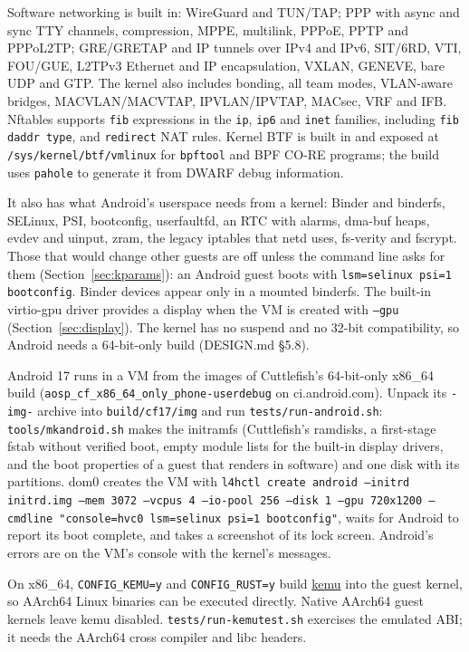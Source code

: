 \documentclass[11pt,a4paper]{report}
\newcommand{\cmd}[1]{\texttt{#1}}
\newcommand{\file}[1]{\texttt{#1}}
\begin{document}
Software networking is built in: WireGuard and TUN/TAP; PPP with async and
sync TTY channels, compression, MPPE, multilink, PPPoE, PPTP and PPPoL2TP;
GRE/GRETAP and IP tunnels over IPv4 and IPv6, SIT/6RD, VTI, FOU/GUE,
L2TPv3 Ethernet and IP encapsulation, VXLAN, GENEVE, bare UDP and GTP.
The kernel also includes bonding, all team modes, VLAN-aware bridges,
MACVLAN/MACVTAP, IPVLAN/IPVTAP, MACsec, VRF and IFB.
Nftables supports \texttt{fib} expressions in the \texttt{ip}, \texttt{ip6}
and \texttt{inet} families, including \texttt{fib daddr type}, and
\texttt{redirect} NAT rules.
Kernel BTF is built in and exposed at \file{/sys/kernel/btf/vmlinux} for
\texttt{bpftool} and BPF CO-RE programs; the build uses \texttt{pahole}
to generate it from DWARF debug information.

It also has what Android's userspace needs from a kernel: Binder and
binderfs, SELinux, PSI, bootconfig, userfaultfd, an RTC with alarms,
dma-buf heaps, evdev and uinput, zram, the legacy iptables that netd uses,
fs-verity and fscrypt. Those that would change other guests are off unless
the command line asks for them (Section~\ref{sec:kparams}): an Android
guest boots with \texttt{lsm=selinux psi=1 bootconfig}. Binder devices
appear only in a mounted binderfs. The built-in virtio-gpu driver provides
a display when the VM is created with \texttt{--gpu} (Section~\ref{sec:display}).
The kernel has no suspend
and no 32-bit compatibility, so Android needs a 64-bit-only build
(DESIGN.md \S5.8).

Android 17 runs in a VM from the images of Cuttlefish's 64-bit-only
x86\_64 build (\texttt{aosp\_cf\_x86\_64\_only\_phone-userdebug} on
ci.android.com). Unpack its \texttt{-img-} archive into
\texttt{build/cf17/img} and run \texttt{tests/run-android.sh}:
\texttt{tools/mkandroid.sh} makes the initramfs (Cuttlefish's ramdisks,
a first-stage fstab without verified boot, empty module lists for the
built-in display drivers, and the boot properties of a guest that renders in software)
and one disk with its partitions. dom0 creates the VM with
\texttt{l4hctl create android --initrd initrd.img --mem 3072 --vcpus 4
--io-pool 256 --disk 1 --gpu 720x1200 --cmdline "console=hvc0
lsm=selinux psi=1 bootconfig"}, waits for Android to report its boot
complete, and takes a screenshot of its lock screen. Android's errors
are on the VM's console with the kernel's messages.

On x86\_64, \texttt{CONFIG\_KEMU=y} and \texttt{CONFIG\_RUST=y} build
\href{https://github.com/losfair/kemu}{kemu} into the guest kernel, so
AArch64 Linux binaries can be executed directly. Native AArch64 guest
kernels leave kemu disabled. \cmd{tests/run-kemutest.sh} exercises the
emulated ABI; it needs the AArch64 cross compiler and libc headers.
\end{document}
